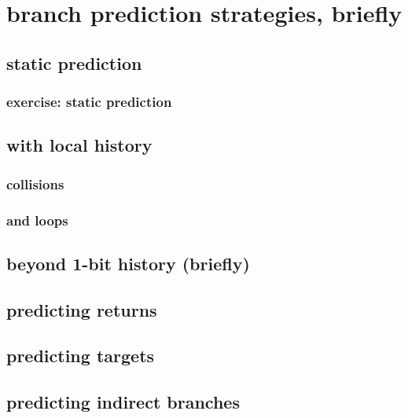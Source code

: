 \section{branch prediction strategies, briefly}

\subsection{static prediction}


\subsubsection{exercise: static prediction}


\subsection{with local history}


\subsubsection{collisions}


\subsubsection{and loops}



\subsection{beyond 1-bit history (briefly)}


\subsection{predicting returns}


\subsection{predicting targets}


\subsection{predicting indirect branches}

